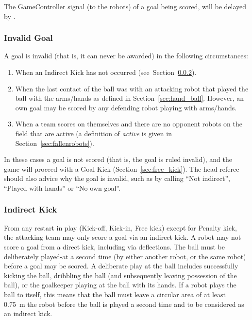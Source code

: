 The GameController signal (to the robots) of a goal being scored, will be delayed by \GoalScoredDelay.

\subsubsection{Invalid Goal}
\label{sec:invalid_goal}

A goal is invalid (that is, it can never be awarded) in the following circumstances:
\begin{enumerate}
    \item When an Indirect Kick has not occurred (see~Section~\ref{sec:indirect_kick}).
    \item When the last contact of the ball was with an attacking robot that played the ball with the arms/hands as defined in Section~\ref{sec:hand_ball}. However, an own goal may be scored by any defending robot playing with arms/hands.
    \item When a team scores on themselves and there are no opponent robots on the field that are active (a definition of \emph{active} is given in Section~\ref{sec:fallenrobots}).
\end{enumerate}

In these cases a goal is not scored (that is, the goal is ruled invalid), and the game will proceed with a Goal Kick (\cf Section~\ref{sec:free_kick}). The head referee should also advice why the goal is invalid, such as by calling ``Not indirect'', ``Played with hands'' or ``No own goal''.

\subsubsection{Indirect Kick}
\label{sec:indirect_kick}

From any restart in play (Kick-off, Kick-in, Free kick) except for Penalty kick, the attacking team may only score a goal via an indirect kick.
A robot may not score a goal from a direct kick, including via deflections.
The ball must be deliberately played-at a second time (by either another robot, or the same robot) before a goal may be scored.
A deliberate play at the ball includes successfully kicking the ball, dribbling the ball (and subsequently leaving possession of the ball), or the goalkeeper playing at the ball with its hands.
If a robot plays the ball to itself, this means that the ball must leave a circular area of at least \qty{0.75}{\metre} the robot before the ball is played a second time and to be considered as an indirect
kick.

